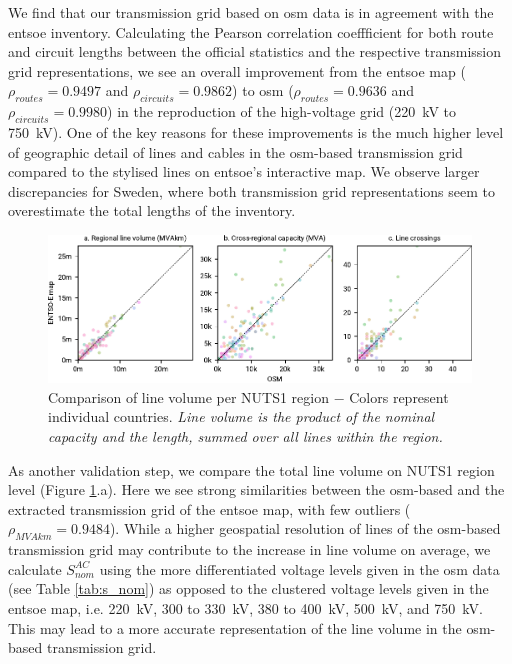 \documentclass[fleqn,10pt]{wlscirep}
\begin{document}
We find that our transmission grid based on \gls{osm} data is in agreement with the \acrshort{entsoe} inventory. Calculating the Pearson correlation coeffficient for both route and circuit lengths between the official statistics and the respective transmission grid representations, we see an overall improvement from the \acrshort{entsoe} map ($\rho_{routes} = 0.9497$ and $\rho_{circuits} = 0.9862$) to \gls{osm} ($\rho_{routes} = 0.9636$ and $\rho_{circuits} = 0.9980$) in the reproduction of the high-voltage grid (\SI{220}{\kilo\volt} to \SI{750}{\kilo\volt}). One of the key reasons for these improvements is the much higher level of geographic detail of lines and cables in the \gls{osm}-based transmission grid compared to the stylised lines on \acrshort{entsoe}'s interactive map. We observe larger discrepancies for Sweden, where both transmission grid representations seem to overestimate the total lengths of the inventory.

\begin{figure}[!htbp]
    \centering
    \includegraphics{figures/fig_scatter_joined.pdf}
    \caption{Comparison of line volume per NUTS1 region $-$ Colors represent individual countries. \textit{Line volume is the product of the nominal capacity and the length, summed over all lines within the region.}}
    \label{fig:scatter_joined}
\end{figure}

As another validation step, we compare the total line volume on NUTS1 region level (Figure \ref{fig:scatter_joined}.a). Here we see strong similarities between the \acrshort{osm}-based and the extracted transmission grid of the \acrshort{entsoe} map, with few outliers ($\rho_{MVAkm} = 0.9484$). While a higher geospatial resolution of lines of the \gls{osm}-based transmission grid may contribute to the increase in line volume on average, we calculate $S_{nom}^{AC}$ using the more differentiated voltage levels given in the \gls{osm} data (see Table \ref{tab:s_nom}) as opposed to the clustered voltage levels given in the \acrshort{entsoe} map, i.e. \SI{220}{\kilo\volt}, 300 to \SI{330}{\kilo\volt}, 380 to \SI{400}{\kilo\volt}, \SI{500}{\kilo\volt}, and \SI{750}{\kilo\volt}. This may lead to a more accurate representation of the line volume in the \gls{osm}-based transmission grid.
\end{document}
